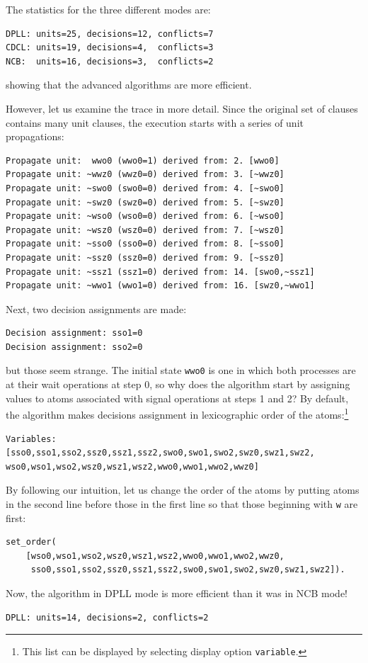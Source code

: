 \documentclass[11pt]{report}
\newcommand*{\p}[1]{\textup{\texttt{#1}}}
\begin{document}
The statistics for the three different modes are:
\begin{verbatim}
DPLL: units=25, decisions=12, conflicts=7
CDCL: units=19, decisions=4,  conflicts=3
NCB:  units=16, decisions=3,  conflicts=2
\end{verbatim}
showing that the advanced algorithms are more efficient.

However, let us examine the trace in more detail. Since the original set
of clauses contains many unit clauses, the execution starts with a
series of unit propagations:
\begin{verbatim}
Propagate unit:  wwo0 (wwo0=1) derived from: 2. [wwo0]
Propagate unit: ~wwz0 (wwz0=0) derived from: 3. [~wwz0]
Propagate unit: ~swo0 (swo0=0) derived from: 4. [~swo0]
Propagate unit: ~swz0 (swz0=0) derived from: 5. [~swz0]
Propagate unit: ~wso0 (wso0=0) derived from: 6. [~wso0]
Propagate unit: ~wsz0 (wsz0=0) derived from: 7. [~wsz0]
Propagate unit: ~sso0 (sso0=0) derived from: 8. [~sso0]
Propagate unit: ~ssz0 (ssz0=0) derived from: 9. [~ssz0]
Propagate unit: ~ssz1 (ssz1=0) derived from: 14. [swo0,~ssz1]
Propagate unit: ~wwo1 (wwo1=0) derived from: 16. [swz0,~wwo1]
\end{verbatim}
Next, two decision assignments are made:
\begin{verbatim}
Decision assignment: sso1=0
Decision assignment: sso2=0
\end{verbatim}
but those seem strange. The initial state \p{wwo0} is one in which both
processes are at their wait operations at step 0, so why does the
algorithm start by assigning values to atoms associated with signal
operations at steps 1 and 2? By default, the algorithm makes decisions
assignment in lexicographic order of the atoms:\footnote{This list can
be displayed by selecting display option \p{variable}.}
\begin{verbatim}
Variables: [sso0,sso1,sso2,ssz0,ssz1,ssz2,swo0,swo1,swo2,swz0,swz1,swz2,
wso0,wso1,wso2,wsz0,wsz1,wsz2,wwo0,wwo1,wwo2,wwz0]
\end{verbatim}
By following our
intuition, let us change the order of the atoms by putting atoms in the
second line before those in the first line so that those beginning with
\p{w} are first:
\begin{verbatim}
set_order(
    [wso0,wso1,wso2,wsz0,wsz1,wsz2,wwo0,wwo1,wwo2,wwz0,
     sso0,sso1,sso2,ssz0,ssz1,ssz2,swo0,swo1,swo2,swz0,swz1,swz2]).
\end{verbatim}
Now, the algorithm in DPLL mode is more efficient than it was in NCB
mode!
\begin{verbatim}
DPLL: units=14, decisions=2, conflicts=2
\end{verbatim}
\end{document}
